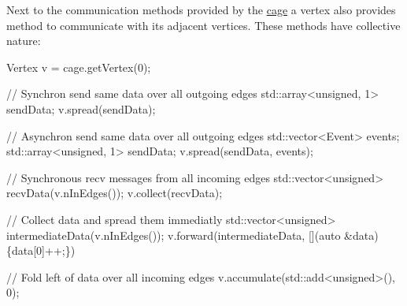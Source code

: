 Next to the communication methods provided by the \hyperlink{cage}{cage} a vertex also provides method to communicate with its adjacent vertices. These methods have collective nature\+:


\begin{DoxyCode}
Vertex v = cage.getVertex(0);

\textcolor{comment}{// Synchron send same data over all outgoing edges}
std::array<unsigned, 1> sendData;
v.spread(sendData);

\textcolor{comment}{// Asynchron send same data over all outgoing edges}
std::vector<Event> events;
std::array<unsigned, 1> sendData;
v.spread(sendData, events);

\textcolor{comment}{// Synchronous recv messages from all incoming edges}
std::vector<unsigned> recvData(v.nInEdges());
v.collect(recvData);

\textcolor{comment}{// Collect data and spread them immediatly}
std::vector<unsigned> intermediateData(v.nInEdges());
v.forward(intermediateData, [](\textcolor{keyword}{auto} &data)\{data[0]++;\})

\textcolor{comment}{// Fold left of data over all incoming edges}
v.accumulate(std::add<unsigned>(), 0);
\end{DoxyCode}
 